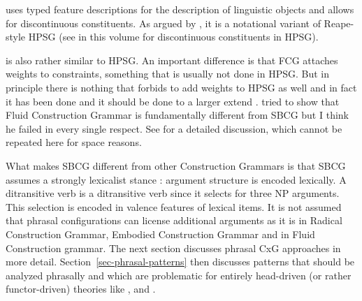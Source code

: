 \documentclass[output=paper]{langsci/langscibook}
\begin{document}
 \citep{BC2005a} uses typed feature descriptions for the description of
linguistic objects and allows for discontinuous constituents. As
argued by \citet[Section~10.6.3]{MuellerGT-Eng1}, it is a notational variant of Reape-style HPSG
\citep{Reape94a} (see \citealt[Section~\ref{sec-domains}]{Mueller2018Order} in this volume for discontinuous constituents in HPSG).

 is also rather similar to HPSG. An important difference is that FCG attaches
weights to constraints, something that is usually not done in HPSG. But in principle there is
nothing that forbids to add weights to HPSG as well and in fact it has been done \citep{Brew95a,BC99a,MT2008a-u} and it should be
done to a larger extend \citep{Miller2013a}.  tried to show that
Fluid Construction Grammar is fundamentally different from SBCG but I think he failed in every
single respect. See  for a detailed discussion, which cannot be repeated here for
space reasons.

What makes SBCG different from other Construction Grammars is that SBCG assumes a strongly
lexicalist stance \citep{SW2011a}: argument structure is encoded lexically. A ditransitive verb is a
ditransitive verb since it selects for three NP arguments. This selection is encoded in valence
features of lexical items. It is not assumed that phrasal configurations can license additional
arguments as it is in Radical Construction Grammar, Embodied Construction Grammar and in Fluid
Construction grammar. The next section discusses phrasal CxG approaches in more
detail. Section~\ref{sec-phrasal-patterns} then discusses patterns that should be analyzed phrasally
and which are problematic for entirely head-driven (or rather functor-driven) theories like ,
 and .


\end{document}
